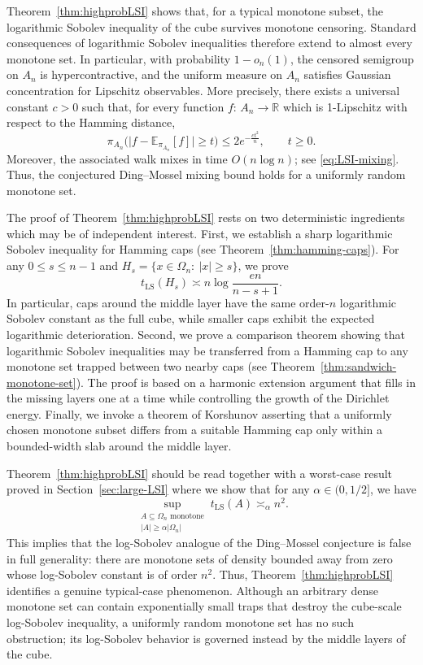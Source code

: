 \documentclass[12pt,final]{amsart}
\newcommand{\1}{\mathbf{1}}
\newcommand{\Exp}[2]{\mathbb{E}_{#1}\left[#2\right]}
\newcommand{\R}{\mathbb{R}}
\begin{document}
Theorem~\ref{thm:highprobLSI} shows that, for a typical monotone subset, the logarithmic Sobolev inequality of the cube survives monotone censoring. Standard consequences of logarithmic Sobolev inequalities therefore extend to almost every monotone set. In particular, with probability $1-o_n(1)$, the censored semigroup on $A_n$ is hypercontractive, and the uniform measure on $A_n$ satisfies Gaussian concentration for Lipschitz observables. More precisely, there exists a universal constant $c>0$ such that, for every function $f:\, A_n\to \R$ which is 1-Lipschitz with respect to the Hamming distance,  
$$
\pi_{A_n}\big(\vert f-\Exp{\pi_{A_n}}{f}\vert \geq t\big) \leq 2e^{-\frac{ct^2}{n}},\qquad t\geq 0.
$$
Moreover, the associated walk mixes in time $O(n\log n)$; see \eqref{eq:LSI-mixing}. Thus, the conjectured Ding--Mossel \cite{ding2014mixing} mixing bound holds for a uniformly random monotone set.

The proof of Theorem~\ref{thm:highprobLSI} rests on two deterministic ingredients which may be of independent interest. First, we establish a sharp logarithmic Sobolev inequality for Hamming caps (see Theorem~\ref{thm:hamming-caps}). For any $0\leq s\leq n-1$ and $H_s=\{x\in\Omega_n:\ |x|\ge s\}$, we prove 
$$
t_{\operatorname{LS}}(H_s)
\asymp
n\log\frac{en}{n-s+1}.
$$
In particular, caps around the middle layer have the same order-$n$ logarithmic Sobolev constant as the full cube, while smaller caps exhibit the expected logarithmic deterioration. Second, we prove a comparison theorem showing that logarithmic Sobolev inequalities may be transferred from a Hamming cap to any monotone set trapped between two nearby caps (see Theorem~\ref{thm:sandwich-monotone-set}). The proof is based on a harmonic extension argument that fills in the missing layers one at a time while controlling the growth of the Dirichlet energy.
Finally, we invoke a theorem of Korshunov \cite{Korshunov03, Korshunov81} asserting that a uniformly chosen monotone subset differs from a suitable Hamming cap only within a bounded-width slab around the middle layer.


Theorem~\ref{thm:highprobLSI} should be read together with a worst-case result proved in Section~\ref{sec:large-LSI} where we show that for any $\alpha\in (0, 1/2]$, we have
$$
     \sup_{\substack{A\subseteq \Omega_n \text{ monotone}\\ |A|\geq \alpha |\Omega_n|} }t_{\operatorname{LS}}(A)  \asymp_\alpha  n^2.
    $$
This implies that the log-Sobolev analogue of the Ding–Mossel conjecture is false in full generality: there are monotone sets of density bounded away from zero whose log-Sobolev constant is of order $n^2$. Thus, Theorem~\ref{thm:highprobLSI} identifies a genuine typical-case phenomenon. Although an arbitrary dense monotone set can contain exponentially small traps that destroy the cube-scale log-Sobolev inequality, a uniformly random monotone set has no such obstruction; its log-Sobolev behavior is governed instead by the middle layers of the cube.
\end{document}
